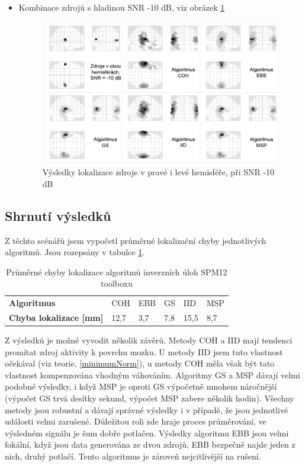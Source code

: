 \begin{itemize}
\item Kombinace zdrojů s hladinou SNR -10 dB, viz obrázek \ref{scenar5}
\begin{figure}[!h]
\includegraphics[width=1.0\textwidth]{casti/aplikace/porovnani/scenar5.png}
\caption{Výsledky lokalizace zdroje v pravé i levé hemisféře, při SNR -10 dB}
\label{scenar5}
\end{figure}

\end{itemize}


\subsection{Shrnutí výsledků}
Z těchto scénářů jsem vypočetl průměrné lokalizační chyby jednotlivých algoritmů. Jsou rozepsány v tabulce \ref{prumerneChyby}.

\begin{table}
\begin{ctucolortab}
\begin{tabular}{lp{1.2cm}p{1.2cm}p{1.2cm}p{1.2cm}p{1.2cm}}
\bfseries Algoritmus & COH	& EBB	& GS	& IID	& MSP \\
\Midrule
\bfseries Chyba lokalizace [mm] & 12,7	& 3,7	& 7,8	& 15,5	& 8,7
\end{tabular}
\end{ctucolortab}
\caption{Průměrné chyby lokalizace algoritmů inverzních úloh SPM12 toolboxu}
\label{prumerneChyby}
\end{table}

Z výsledků je možné vyvodit několik závěrů. Metody COH a IID mají tendenci promítat zdroj aktivity k povrchu mozku. U metody IID jsem tuto vlastnost očekával (viz teorie, \ref{minimumNorm}), u metody COH měla však být tato vlastnost kompenzována vhodným váhováním. Algoritmy GS a MSP dávají velmi podobné výsledky, i když MSP je oproti GS výpočetně mnohem náročnější (výpočet GS trvá desítky sekund, výpočet MSP zabere několik hodin). Všechny metody jsou robustní a dávají správné výsledky i v případě, že jsou jednotlivé události velmi zarušené. Důležitou roli zde hraje proces průměrování, ve výsledném signálu je šum dobře potlačen. Výsledky algoritmu EBB jsou velmi fokální, když jsou data generována ze dvou zdrojů, EBB bezpečně najde jeden z nich, druhý potlačí. Tento algoritmus je zároveň nejcitlivější na rušení.


